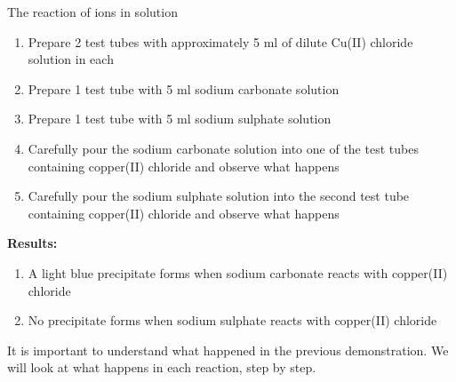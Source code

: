\begin{g_experiment}{The reaction of ions in solution }
\begin{enumerate}[noitemsep, label=\textbf{\arabic*}. ]
            \label{m38719*uid60}\item Prepare 2 test tubes with approximately 5 ml of dilute Cu(II) chloride solution in each
\label{m38719*uid61}\item Prepare 1 test tube with 5 ml sodium carbonate solution
\label{m38719*uid62}\item Prepare 1 test tube with 5 ml sodium sulphate solution
\label{m38719*uid63}\item Carefully pour the sodium carbonate solution into one of the test tubes containing copper(II) chloride and observe what happens
\label{m38719*uid64}\item Carefully pour the sodium sulphate solution into the second test tube containing copper(II) chloride and observe what happens
\end{enumerate}
        \par 
      \label{m38719*id340060}\noindent{}\textbf{Results:}
        \newline
      \label{m38719*id340067}\begin{enumerate}[noitemsep, label=\textbf{\arabic*}. ] 
            \label{m38719*uid65}\item A light blue precipitate forms when sodium carbonate reacts with copper(II) chloride
\label{m38719*uid66}\item No precipitate forms when sodium sulphate reacts with copper(II) chloride
\end{enumerate}
        \par 
\end{g_experiment}
      \label{m38719*id340106}It is important to understand what happened in the previous demonstration. We will look at what happens in each reaction, step by step.\par 
